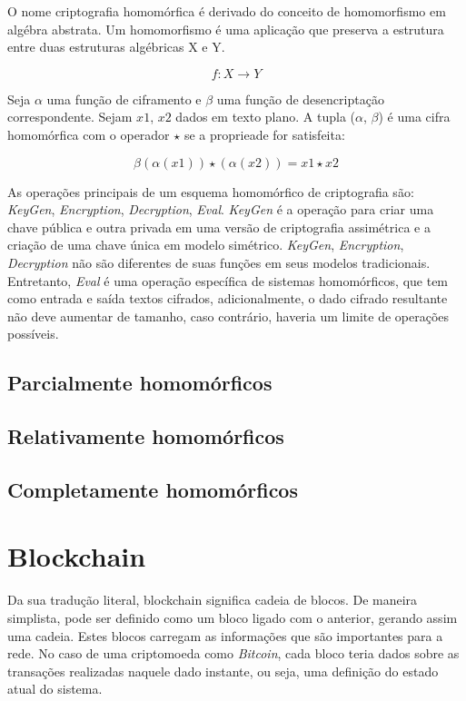 \documentclass{ufsctex/ufsctex}
\begin{document}
O nome criptografia homomórfica é derivado do conceito de homomorfismo em
algébra abstrata. Um homomorfismo é uma aplicação que preserva a estrutura
entre duas estruturas algébricas X e Y.

\begin{equation}
{f} : X \longrightarrow Y
\end{equation}

Seja $\alpha$ uma função de ciframento e $\beta$ uma função de desencriptação
correspondente. Sejam $x1$, $x2$ dados em texto plano. A tupla ($\alpha$, $\beta$)
é uma cifra homomórfica com o operador $\star$ se a proprieade for satisfeita:

\begin{equation}
\beta (\alpha(x1)) \star (\alpha(x2)) = x1 \star x2
\end{equation}

As operações principais de um esquema homomórfico de criptografia são: \textit{KeyGen},
\textit{Encryption}, \textit{Decryption}, \textit{Eval}. \textit{KeyGen} é a operação
para criar uma chave pública e outra privada em uma versão de criptografia assimétrica
e a criação de uma chave única em modelo simétrico. \textit{KeyGen}, \textit{Encryption},
\textit{Decryption} não são diferentes de suas funções em seus modelos tradicionais. 
Entretanto, \textit{Eval} é uma operação específica de sistemas homomórficos, que tem
como entrada e saída textos cifrados, adicionalmente, o dado cifrado resultante não deve
aumentar de tamanho, caso contrário, haveria um limite de operações possíveis.\cite{survey-homo}

\subsection{Parcialmente homomórficos}

\subsection{Relativamente homomórficos}

\subsection{Completamente homomórficos}


\section{Blockchain}

Da sua tradução literal, blockchain significa cadeia de blocos. De  maneira
simplista, pode ser definido como um bloco ligado com o anterior, gerando
assim uma cadeia. Estes blocos carregam as informações que são importantes para
a rede. No caso de uma criptomoeda como \textit{Bitcoin}, cada bloco teria dados sobre
as transações realizadas naquele dado instante, ou seja, uma definição do estado
atual do sistema.
\end{document}
